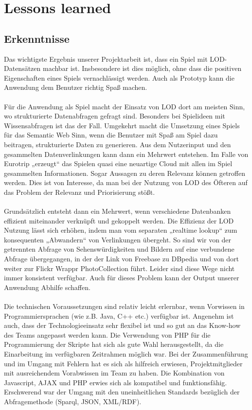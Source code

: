 \documentclass[a4paper, 11pt]{article}
\begin{document}
\section{Lessons learned}
\subsection{Erkenntnisse}
Das wichtigste Ergebnis unserer Projektarbeit ist, dass ein Spiel mit LOD-Datensätzen machbar ist. Insbesondere ist dies möglich, ohne dass die positiven Eigenschaften eines Spiels vernachlässigt werden. Auch als Prototyp kann die Anwendung dem Benutzer richtig Spaß machen.\\\\
Für die Anwendung als Spiel macht der Einsatz von LOD dort am meisten Sinn, wo strukturierte Datenabfragen gefragt sind. Besonders bei Spielideen mit Wissensabfragen ist das der Fall. Umgekehrt macht die Umsetzung eines Spiels für das Semantic Web Sinn, wenn die Benutzer mit Spaß am Spiel dazu beitragen, strukturierte Daten zu generieren. Aus dem Nutzerinput und den gesammelten Datenverlinkungen kann dann ein Mehrwert entstehen. Im Falle von Eurotrip „erzeugt“ das Spielen quasi eine neuartige Cloud mit allen im Spiel gesammelten Informationen. Sogar Aussagen zu deren Relevanz können getroffen werden. Dies ist von Interesse, da man bei der Nutzung von LOD des Öfteren auf das Problem der Relevanz und Priorisierung stößt.\\\\
Grundsätzlich entsteht dann ein Mehrwert, wenn verschiedene Datenbanken effizient miteinander verknüpft und  gekoppelt werden. Die Effizienz der LOD Nutzung lässt sich erhöhen, indem man vom separaten „realtime lookup“ zum konsequenten  „Abwandern“ von Verlinkungen übergeht.  So sind wir von der getrennten Abfrage von Sehenswürdigkeiten und Bildern auf eine verbundene Abfrage übergegangen, in der der Link von Freebase zu DBpedia und von dort weiter zur Flickr Wrappr PhotoCollection führt. Leider sind diese Wege nicht immer konsistent verfügbar. Auch für dieses Problem kann der Output unserer Anwendung Abhilfe schaffen.\\\\
Die technischen Voraussetzungen sind relativ leicht erlernbar, wenn Vorwissen in Programmiersprachen (wie z.B. Java, C++ etc.) verfügbar ist. Angenehm ist auch, dass der Technologieeinsatz sehr flexibel ist und so gut an das Know-how des Teams angepasst werden kann. Die Verwendung von PHP für die Programmierung der Skripte hat sich als gute Wahl herausgestellt, da die Einarbeitung im verfügbaren Zeitrahmen möglich war. Bei der Zusammenführung und im Umgang mit Fehlern hat es sich als hilfreich erwiesen, Projektmitglieder mit ausreichendem Vorabwissen im Team zu haben. Die Kombination von Javascript, AJAX und PHP erwies sich als kompatibel und funktionsfähig. Erschwerend war der Umgang mit den uneinheitlichen Standards bezüglich der Abfragemethode (Sparql, JSON, XML/RDF). \\\\
\end{document}
